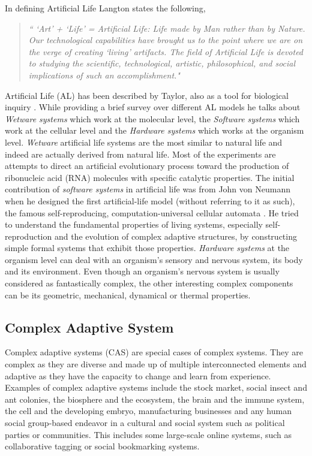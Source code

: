 In defining Artificial Life Langton states the following,

\begin{quote}
\textsl{`` `Art' + `Life' = Artificial Life: Life made by Man rather than by Nature. Our technological capabilities have brought us to the point where we are on the verge of creating `living' artifacts. The field of Artificial Life is devoted to studying the scientific, technological, artistic, philosophical, and social implications of such an accomplishment."}
\end{quote}

Artificial Life (AL) has been described by Taylor, also as a tool for biological inquiry \cite{taylor1993}. While providing a brief survey over different AL models he talks about \textsl{Wetware systems} which work at the molecular level, the \textsl{Software systems} which work at the cellular level and the \textsl{Hardware systems} which works at the organism level. \textsl{Wetware} artificial life systems are the most similar to natural life and indeed are actually derived from natural life. Most of the experiments are attempts to direct an artificial evolutionary process toward the production of ribonucleic acid (RNA) molecules with specific catalytic properties. The initial contribution of \textsl{software systems} in artificial life was from John von Neumann when he designed the first artificial-life model (without referring to it as such), the famous self-reproducing, computation-universal cellular automata \cite{neumann1966}. He tried to understand the fundamental properties of living systems, especially self-reproduction and the evolution of complex adaptive structures, by constructing simple formal systems that exhibit those properties. \textsl{Hardware systems} at the organism level can deal with an organism's sensory and nervous system, its body and its environment. Even though an organism's nervous system is usually considered as fantastically complex, the other interesting complex components can be its geometric, mechanical, dynamical or thermal properties. 

\subsection{Complex Adaptive System}
\label{subsec:complex-adaptive-system}
Complex adaptive systems (CAS) are special cases of complex systems. They are complex as they are diverse and made up of multiple interconnected elements and adaptive as they have the capacity to change and learn from experience. Examples of complex adaptive systems include the stock market, social insect and ant colonies, the biosphere and the ecosystem, the brain and the immune system, the cell and the developing embryo, manufacturing businesses and any human social group-based endeavor in a cultural and social system such as political parties or communities. This includes some large-scale online systems, such as collaborative tagging or social bookmarking systems.

